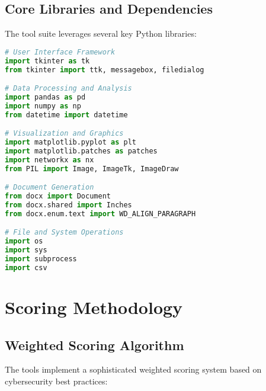 \documentclass[binding=0.6cm]{sapthesis}
\begin{document}
\subsection{Core Libraries and Dependencies}

The tool suite leverages several key Python libraries:

\begin{lstlisting}[language=Python, caption=Core Dependencies Structure]
# User Interface Framework
import tkinter as tk
from tkinter import ttk, messagebox, filedialog

# Data Processing and Analysis
import pandas as pd
import numpy as np
from datetime import datetime

# Visualization and Graphics
import matplotlib.pyplot as plt
import matplotlib.patches as patches
import networkx as nx
from PIL import Image, ImageTk, ImageDraw

# Document Generation
from docx import Document
from docx.shared import Inches
from docx.enum.text import WD_ALIGN_PARAGRAPH

# File and System Operations
import os
import sys
import subprocess
import csv
\end{lstlisting}

\section{Scoring Methodology}

\subsection{Weighted Scoring Algorithm}

The tools implement a sophisticated weighted scoring system based on cybersecurity best practices:
\end{document}
